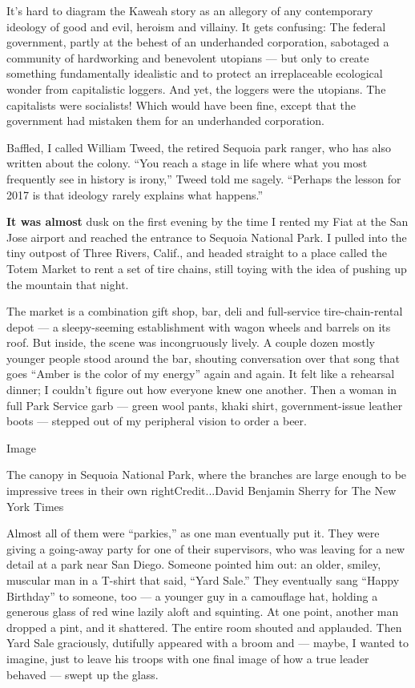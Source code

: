 It's hard to diagram the Kaweah story as an allegory of any contemporary
ideology of good and evil, heroism and villainy. It gets confusing: The
federal government, partly at the behest of an underhanded corporation,
sabotaged a community of hardworking and benevolent utopians --- but
only to create something fundamentally idealistic and to protect an
irreplaceable ecological wonder from capitalistic loggers. And yet, the
loggers were the utopians. The capitalists were socialists! Which would
have been fine, except that the government had mistaken them for an
underhanded corporation.

Baffled, I called William Tweed, the retired Sequoia park ranger, who
has also written about the colony. ``You reach a stage in life where
what you most frequently see in history is irony,'' Tweed told me
sagely. ``Perhaps the lesson for 2017 is that ideology rarely explains
what happens.''

\textbf{It was almost} dusk on the first evening by the time I rented my
Fiat at the San Jose airport and reached the entrance to Sequoia
National Park. I pulled into the tiny outpost of Three Rivers, Calif.,
and headed straight to a place called the Totem Market to rent a set of
tire chains, still toying with the idea of pushing up the mountain that
night.

The market is a combination gift shop, bar, deli and full-service
tire-chain-rental depot --- a sleepy-seeming establishment with wagon
wheels and barrels on its roof. But inside, the scene was incongruously
lively. A couple dozen mostly younger people stood around the bar,
shouting conversation over that song that goes ``Amber is the color of
my energy'' again and again. It felt like a rehearsal dinner; I couldn't
figure out how everyone knew one another. Then a woman in full Park
Service garb --- green wool pants, khaki shirt, government-issue leather
boots --- stepped out of my peripheral vision to order a beer.

Image

The canopy in Sequoia National Park, where the branches are large enough
to be impressive trees in their own rightCredit...David Benjamin Sherry
for The New York Times

Almost all of them were ``parkies,'' as one man eventually put it. They
were giving a going-away party for one of their supervisors, who was
leaving for a new detail at a park near San Diego. Someone pointed him
out: an older, smiley, muscular man in a T-shirt that said, ``Yard
Sale.'' They eventually sang ``Happy Birthday'' to someone, too --- a
younger guy in a camouflage hat, holding a generous glass of red wine
lazily aloft and squinting. At one point, another man dropped a pint,
and it shattered. The entire room shouted and applauded. Then Yard Sale
graciously, dutifully appeared with a broom and --- maybe, I wanted to
imagine, just to leave his troops with one final image of how a true
leader behaved --- swept up the glass.


